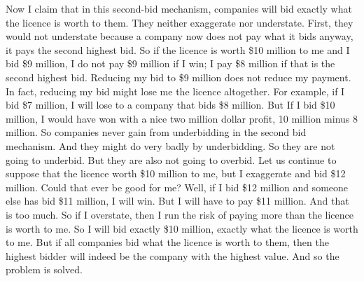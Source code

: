 \documentclass[12pt,a4paper]{article}
\newenvironment{original}{%
  \par\vspace{4pt}\noindent%
  \color{black}%
  \ignorespaces
}{%
  \par\vspace{2pt}%
}
\begin{document}
\begin{original}
Now I claim that in this second-bid mechanism, companies will bid exactly what the licence is worth to them. They neither exaggerate nor understate. First, they would not understate because a company now does not pay what it bids anyway, it pays the second highest bid. So if the licence is worth \$10 million to me and I bid \$9 million, I do not pay \$9 million if I win; I pay \$8 million if that is the second highest bid. Reducing my bid to \$9 million does not reduce my payment. In fact, reducing my bid might lose me the licence altogether. For example, if I bid \$7 million, I will lose to a company that bids \$8 million. But If I bid \$10 million, I would have won with a nice two million dollar profit, 10 million minus 8 million. So companies never gain from underbidding in the second bid mechanism. And they might do very badly by underbidding. So they are not going to underbid. But they are also not going to overbid. Let us continue to suppose that the licence worth \$10 million to me, but I exaggerate and bid \$12 million. Could that ever be good for me? Well, if I bid \$12 million and someone else has bid \$11 million, I will win. But I will have to pay \$11 million. And that is too much. So if I overstate, then I run the risk of paying more than the licence is worth to me. So I will bid exactly \$10 million, exactly what the licence is worth to me. But if all companies bid what the licence is worth to them, then the highest bidder will indeed be the company with the highest value. And so the problem is solved.
\end{original}
\end{document}
